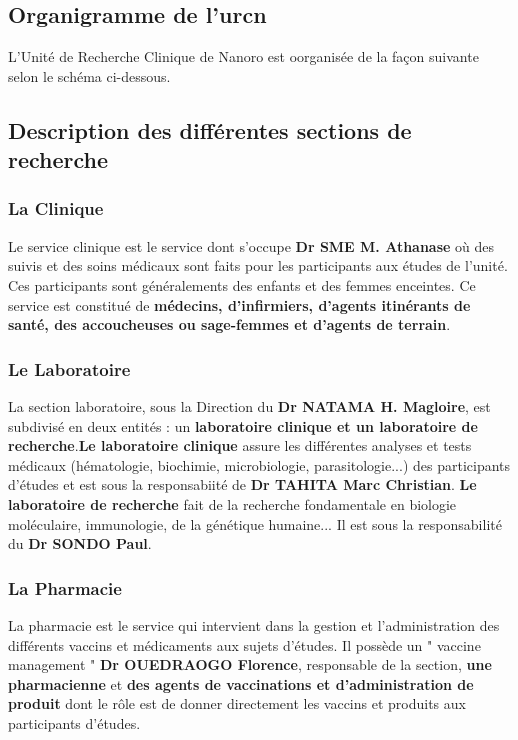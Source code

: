\documentclass[12pt]{report}
\begin{document}
			\subsection{Organigramme de l'\gls{urcn}}
			
			L'Unité de Recherche Clinique de Nanoro est oorganisée de la façon suivante selon le schéma ci-dessous.
			
			\subsection{Description des différentes sections de recherche}
			
				\subsubsection{La Clinique}
				
				Le service clinique est le service dont s'occupe \textbf{Dr SME M. Athanase} où des suivis et des soins médicaux sont faits pour les participants aux études de l'unité. Ces participants sont généralements des enfants et des femmes enceintes. Ce service est constitué de \textbf{médecins, d'infirmiers, d'agents itinérants de santé, des accoucheuses ou sage-femmes et d'agents de terrain}.
				
				\subsubsection{Le Laboratoire}
				
				La section laboratoire, sous la Direction du \textbf{Dr NATAMA H. Magloire}, est subdivisé en deux entités : un \textbf{laboratoire clinique et un laboratoire de recherche}.\textbf{Le laboratoire clinique} assure les différentes analyses et tests médicaux (hématologie, biochimie, microbiologie, parasitologie...) des participants d'études et est sous la responsabiité de \textbf{Dr TAHITA Marc Christian}. \textbf{Le laboratoire de recherche} fait de la recherche fondamentale en biologie moléculaire, immunologie, de la génétique humaine... Il est sous la responsabilité du \textbf{Dr SONDO Paul}.
				
				\subsubsection{La Pharmacie}
				
				La pharmacie est le service qui intervient dans la gestion et l'administration des différents vaccins et médicaments aux sujets d'études. Il possède un " vaccine management " \textbf{Dr OUEDRAOGO Florence}, responsable de la section, \textbf{une pharmacienne} et \textbf{des agents de vaccinations et d'administration de produit} dont le rôle est de donner directement les vaccins et produits aux participants d'études.
				
\end{document}
